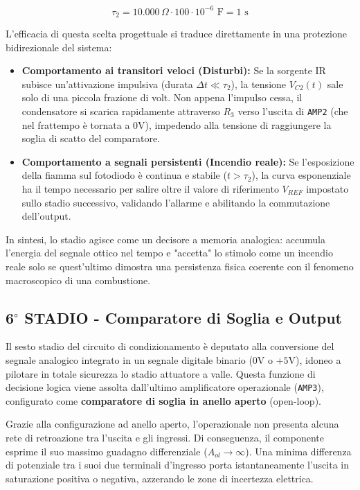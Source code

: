 \documentclass[12pt,a4paper]{article}
\begin{document}
        \begin{equation}
            \tau_2 = 10.000\,\Omega \cdot 100 \cdot 10^{-6}\text{ F} = 1\text{ s}
        \end{equation}

        L'efficacia di questa scelta progettuale si traduce direttamente in una protezione bidirezionale del sistema:
        
        \begin{itemize}
            \item \textbf{Comportamento ai transitori veloci (Disturbi):} Se la sorgente IR subisce un'attivazione impulsiva (durata $\Delta t \ll \tau_2$), la tensione 
                $V_{C2}(t)$ sale solo di una piccola frazione di volt. Non appena l'impulso cessa, il condensatore si scarica rapidamente attraverso $R_3$ verso l'uscita 
                di \texttt{AMP2} (che nel frattempo è tornata a $0\text{V}$), impedendo alla tensione di raggiungere la soglia di scatto del comparatore.
            \item \textbf{Comportamento a segnali persistenti (Incendio reale):} Se l'esposizione della fiamma sul fotodiodo è continua e stabile ($t > \tau_2$), la curva 
                esponenziale ha il tempo necessario per salire oltre il valore di riferimento $V_{REF}$ impostato sullo stadio successivo, validando l'allarme e abilitando 
                la commutazione dell'output.
        \end{itemize}

        In sintesi, lo stadio agisce come un decisore a memoria analogica: accumula l'energia del segnale ottico nel tempo e "accetta" lo stimolo come un incendio reale 
        solo se quest'ultimo dimostra una persistenza fisica coerente con il fenomeno macroscopico di una combustione.

    \subsection{6$^\circ$ STADIO - Comparatore di Soglia e Output}
        Il sesto stadio del circuito di condizionamento è deputato alla conversione del segnale analogico integrato in un segnale digitale binario ($0\text{V}$ o $+5\text{V}$), 
        idoneo a pilotare in totale sicurezza lo stadio attuatore a valle. Questa funzione di decisione logica viene assolta dall'ultimo amplificatore operazionale (\texttt{AMP3}), 
        configurato come \textbf{comparatore di soglia in anello aperto} (open-loop).

        Grazie alla configurazione ad anello aperto, l'operazionale non presenta alcuna rete di retroazione tra l'uscita e gli ingressi. Di conseguenza, il componente esprime il suo
        massimo guadagno differenziale ($A_{ol} \to \infty$). Una minima differenza di potenziale tra i suoi due terminali d'ingresso porta istantaneamente l'uscita in saturazione 
        positiva o negativa, azzerando le zone di incertezza elettrica.
\end{document}
